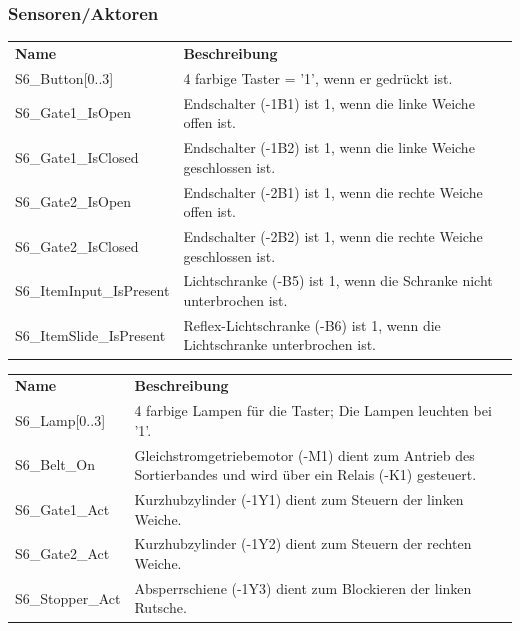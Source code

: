\documentclass[11pt,a4paper,ngerman]{article}
\begin{document}
\subsubsection{Sensoren/Aktoren}
\begin{center}
	\setlength\extrarowheight{4pt}
	\small
	\begin{tabularx}{\textwidth}{|p{4cm}|X|}
		\hline
		\rowcolor{tublau}
		\multicolumn{2}{|c|}{\bf \color{white} \large Sensoren}\\
		\hline\hline
		\rowcolor{gray!80}
		\bf Name & \bf Beschreibung\\
		\hline\hline
		S6\_Button[0..3] & 4 farbige Taster = '1', wenn er gedrückt ist.\\
		S6\_Gate1\_IsOpen & Endschalter (-1B1) ist 1, wenn die linke Weiche offen ist.\\
		S6\_Gate1\_IsClosed & Endschalter (-1B2) ist 1, wenn die linke Weiche geschlossen ist.\\
		S6\_Gate2\_IsOpen & Endschalter (-2B1) ist 1, wenn die rechte Weiche offen ist.\\
		S6\_Gate2\_IsClosed & Endschalter (-2B2) ist 1, wenn die rechte Weiche geschlossen ist.\\
		S6\_ItemInput\_IsPresent & Lichtschranke (-B5) ist 1, wenn die Schranke nicht unterbrochen ist.\\
		S6\_ItemSlide\_IsPresent & Reflex-Lichtschranke (-B6) ist 1, wenn die Lichtschranke unterbrochen ist.\\
		\hline
	\end{tabularx}
	
	\medskip
	
	\begin{tabularx}{\textwidth}{|p{4cm}|X|}
		\hline
		\rowcolor{tublau}
		\multicolumn{2}{|c|}{\bf \color{white} \large Aktoren}\\
		\hline\hline
		\rowcolor{gray!80}
		\bf Name & \bf Beschreibung\\
		\hline\hline
		S6\_Lamp[0..3] & 4 farbige Lampen für die Taster; Die Lampen leuchten bei '1'.\\
		S6\_Belt\_On & Gleichstromgetriebemotor (-M1) dient zum Antrieb des Sortierbandes und wird über ein Relais (-K1) gesteuert.\\
		S6\_Gate1\_Act & Kurzhubzylinder (-1Y1) dient zum Steuern der linken Weiche.\\
		S6\_Gate2\_Act & Kurzhubzylinder (-1Y2) dient zum Steuern der rechten Weiche.\\
		S6\_Stopper\_Act & Absperrschiene (-1Y3) dient zum Blockieren der linken Rutsche.\\
		\hline
	\end{tabularx}
\end{center}
\end{document}
